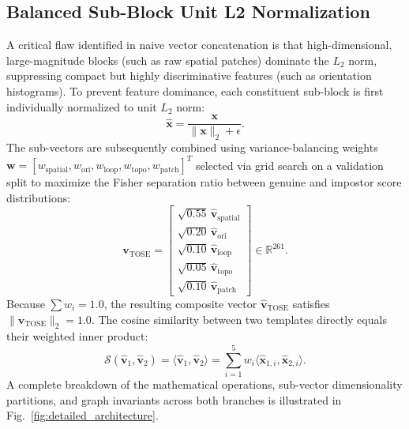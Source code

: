 \documentclass[lettersize,journal]{IEEEtran}
\begin{document}
\subsection{Balanced Sub-Block Unit L2 Normalization}
A critical flaw identified in naive vector concatenation is that high-dimensional, large-magnitude blocks (such as raw spatial patches) dominate the $L_2$ norm, suppressing compact but highly discriminative features (such as orientation histograms). To prevent feature dominance, each constituent sub-block is first individually normalized to unit $L_2$ norm:
\begin{equation}
    \hat{\mathbf{x}} = \frac{\mathbf{x}}{\|\mathbf{x}\|_2 + \epsilon}.
\end{equation}
The sub-vectors are subsequently combined using variance-balancing weights $\mathbf{w} = [w_{\text{spatial}}, w_{\text{ori}}, w_{\text{loop}}, w_{\text{topo}}, w_{\text{patch}}]^T$ selected via grid search on a validation split to maximize the Fisher separation ratio between genuine and impostor score distributions:
\begin{equation}
    \mathbf{v}_{\text{TOSE}} = \begin{bmatrix}
        \sqrt{0.55} \, \hat{\mathbf{v}}_{\text{spatial}} \\
        \sqrt{0.20} \, \hat{\mathbf{v}}_{\text{ori}} \\
        \sqrt{0.10} \, \hat{\mathbf{v}}_{\text{loop}} \\
        \sqrt{0.05} \, \hat{\mathbf{v}}_{\text{topo}} \\
        \sqrt{0.10} \, \hat{\mathbf{v}}_{\text{patch}}
    \end{bmatrix} \in \mathbb{R}^{261}.
\end{equation}
Because $\sum w_i = 1.0$, the resulting composite vector $\hat{\mathbf{v}}_{\text{TOSE}}$ satisfies $\|\hat{\mathbf{v}}_{\text{TOSE}}\|_2 = 1.0$. The cosine similarity between two templates directly equals their weighted inner product:
\begin{equation}
    \mathcal{S}(\hat{\mathbf{v}}_1, \hat{\mathbf{v}}_2) = \langle \hat{\mathbf{v}}_1, \hat{\mathbf{v}}_2 \rangle = \sum_{i=1}^5 w_i \langle \hat{\mathbf{x}}_{1, i}, \hat{\mathbf{x}}_{2, i} \rangle.
\end{equation}
A complete breakdown of the mathematical operations, sub-vector dimensionality partitions, and graph invariants across both branches is illustrated in Fig.~\ref{fig:detailed_architecture}.
\end{document}
